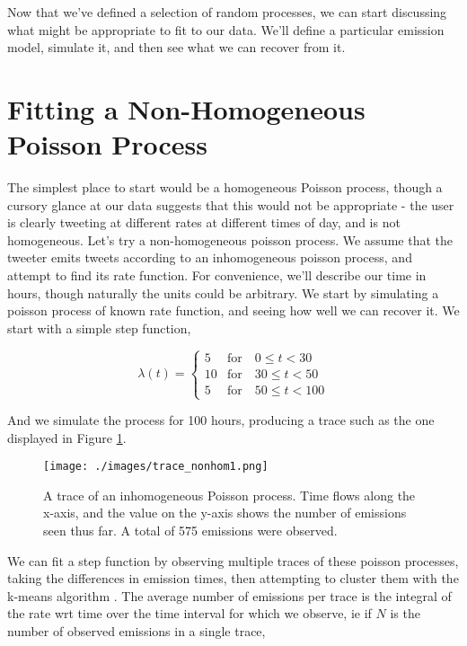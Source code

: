 Now that we've defined a selection of random processes, we can start discussing what might be appropriate to fit to our data. We'll define a particular emission model, simulate it, and then see what we can recover from it.

\section{Fitting a Non-Homogeneous Poisson Process}

The simplest place to start would be a homogeneous Poisson process, though a cursory glance at our data suggests that this would not be appropriate - the user is clearly tweeting at different rates at different times of day, and is not homogeneous. Let's try a non-homogeneous poisson process. We assume that the tweeter emits tweets according to an inhomogeneous poisson process, and attempt to find its rate function. For convenience, we'll describe our time in hours, though naturally the units could be arbitrary. We start by simulating a poisson process of known rate function, and seeing how well we can recover it. We start with a simple step function,

$$
\lambda(t) = 
\begin{cases}
5  & \mbox{for} \quad 0  \leqslant t < 30\\
10 & \mbox{for} \quad 30 \leqslant t < 50\\
5  & \mbox{for} \quad 50 \leqslant t < 100
\end{cases}
$$

And we simulate the process for 100 hours, producing a trace such as the one displayed in Figure \ref{trace_nonhom1}.

\begin{figure}[h]
\texttt{[image: ./images/trace\_nonhom1.png]}
\caption{A trace of an inhomogeneous Poisson process. Time flows along the x-axis, and the value on the y-axis shows the number of emissions seen thus far. A total of 575 emissions were observed.}
\label{trace_nonhom1}
\end{figure}

We can fit a step function by observing multiple traces of these poisson processes, taking the differences in emission times, then attempting to cluster them with the k-means algorithm%
. The average number of emissions per trace is the integral of the rate wrt time over the time interval for which we observe, ie if $N$ is the number of observed emissions in a single trace,

